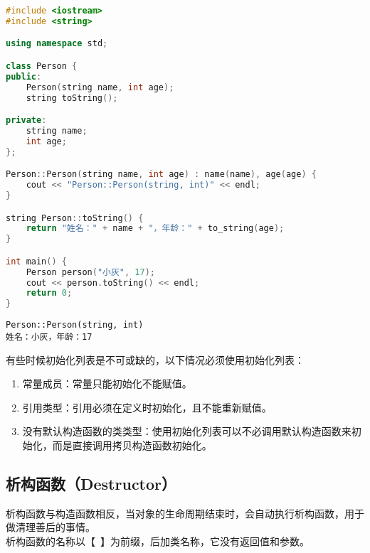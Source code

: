 \begin{lstlisting}[language=C++]
#include <iostream>
#include <string>

using namespace std;

class Person {
public:
    Person(string name, int age);
    string toString();

private:
    string name;
    int age;
};

Person::Person(string name, int age) : name(name), age(age) {
    cout << "Person::Person(string, int)" << endl;
}

string Person::toString() {
    return "姓名：" + name + "，年龄：" + to_string(age);
}

int main() {
    Person person("小灰", 17);
    cout << person.toString() << endl;    
    return 0;
}
\end{lstlisting}

\begin{tcolorbox}
	\begin{verbatim}
Person::Person(string, int)
姓名：小灰，年龄：17
	\end{verbatim}
\end{tcolorbox}

有些时候初始化列表是不可或缺的，以下情况必须使用初始化列表：

\begin{enumerate}
	\item 常量成员：常量只能初始化不能赋值。

	\item 引用类型：引用必须在定义时初始化，且不能重新赋值。

	\item 没有默认构造函数的类类型：使用初始化列表可以不必调用默认构造函数来初始化，而是直接调用拷贝构造函数初始化。
\end{enumerate}

\vspace{0.5cm}

\subsection{析构函数（Destructor）}

析构函数与构造函数相反，当对象的生命周期结束时，会自动执行析构函数，用于做清理善后的事情。\\

析构函数的名称以【~】为前缀，后加类名称，它没有返回值和参数。\\


